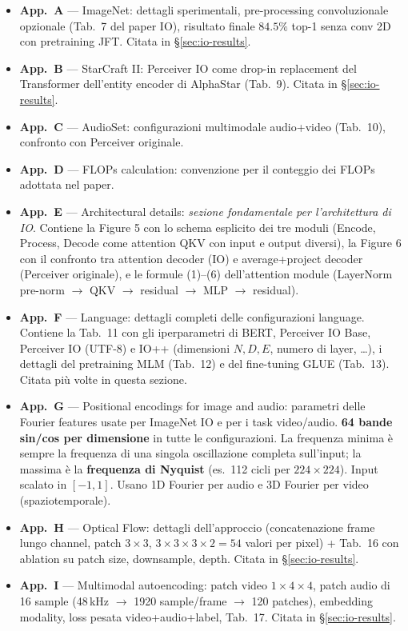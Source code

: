 \documentclass[
  11pt,
]{article}
\begin{document}
\begin{notabox}[title={\textbf{Mappa delle appendici del paper Perceiver IO (Jaegle et al., 2022)}}]
\begin{itemize}\setlength\itemsep{0.1em}
\item \textbf{App.\ A} --- ImageNet: dettagli sperimentali, pre-processing convoluzionale opzionale (Tab.\ 7 del paper IO), risultato finale $84.5\%$ top-1 senza conv 2D con pretraining JFT. Citata in \S\ref{sec:io-results}.
\item \textbf{App.\ B} --- StarCraft II: Perceiver IO come drop-in replacement del Transformer dell'entity encoder di AlphaStar (Tab.\ 9). Citata in \S\ref{sec:io-results}.
\item \textbf{App.\ C} --- AudioSet: configurazioni multimodale audio+video (Tab.\ 10), confronto con Perceiver originale.
\item \textbf{App.\ D} --- FLOPs calculation: convenzione per il conteggio dei FLOPs adottata nel paper.
\item \textbf{App.\ E} --- Architectural details: \emph{sezione fondamentale per l'architettura di IO}. Contiene la Figure 5 con lo schema esplicito dei tre moduli (Encode, Process, Decode come attention QKV con input e output diversi), la Figure 6 con il confronto tra attention decoder (IO) e average+project decoder (Perceiver originale), e le formule (1)--(6) dell'attention module (LayerNorm pre-norm $\to$ QKV $\to$ residual $\to$ MLP $\to$ residual).
\item \textbf{App.\ F} --- Language: dettagli completi delle configurazioni language. Contiene la Tab.\ 11 con gli iperparametri di BERT, Perceiver IO Base, Perceiver IO (UTF-8) e IO++ (dimensioni $N, D, E$, numero di layer, \ldots), i dettagli del pretraining MLM (Tab.\ 12) e del fine-tuning GLUE (Tab.\ 13). Citata più volte in questa sezione.
\item \textbf{App.\ G} --- Positional encodings for image and audio: parametri delle Fourier features usate per ImageNet IO e per i task video/audio. \textbf{64 bande sin/cos per dimensione} in tutte le configurazioni. La frequenza minima è sempre la frequenza di una singola oscillazione completa sull'input; la massima è la \textbf{frequenza di Nyquist} (es.\ 112 cicli per $224 \times 224$). Input scalato in $[-1, 1]$. Usano 1D Fourier per audio e 3D Fourier per video (spaziotemporale).
\item \textbf{App.\ H} --- Optical Flow: dettagli dell'approccio (concatenazione frame lungo channel, patch $3 \times 3$, $3 \times 3 \times 3 \times 2 = 54$ valori per pixel) + Tab.\ 16 con ablation su patch size, downsample, depth. Citata in \S\ref{sec:io-results}.
\item \textbf{App.\ I} --- Multimodal autoencoding: patch video $1 \times 4 \times 4$, patch audio di 16 sample (48\,kHz $\to$ 1920 sample/frame $\to$ 120 patches), embedding modality, loss pesata video+audio+label, Tab.\ 17. Citata in \S\ref{sec:io-results}.
\end{itemize}
\end{notabox}
\end{document}
